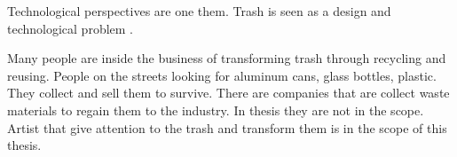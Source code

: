 Technological perspectives are one them. Trash is seen as a design and technological problem \cite{mcdonough2010cradle}.  





Many people are inside the business of transforming trash through recycling and reusing. People on the streets looking for aluminum cans, glass bottles, plastic. They collect and sell them to survive. There are companies that are collect waste materials to regain them to the industry. In thesis they are not in the scope. Artist that give attention to the trash and transform them is in the scope of this thesis.


